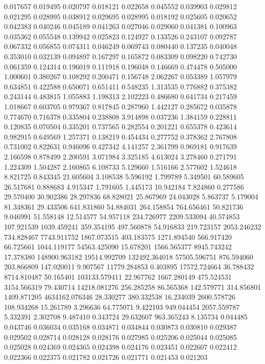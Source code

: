 0.017657
0.019495
0.020797
0.018121
0.022658
0.045552
0.039903
0.029812
0.021295
0.028995
0.038912
0.029695
0.028995
0.018192
0.025605
0.020652
0.042383
0.040246
0.045189
0.041263
0.027046
0.029060
0.041381
0.100963
0.035362
0.055548
0.139942
0.025823
0.124927
0.133526
0.243107
0.092787
0.067332
0.056855
0.074311
0.046249
0.069743
0.080440
0.137235
0.040048
0.353010
0.032139
0.094897
0.167297
0.165872
0.083309
0.098220
0.742730
0.061359
0.124314
0.196019
0.111918
0.196048
0.146669
0.474478
0.505000
1.000601
0.380267
0.108292
0.200471
0.156748
2.062267
0.053389
1.057979
0.634851
0.422588
0.650071
0.651411
0.548235
1.313535
0.776882
0.375382
0.243144
0.483815
1.055883
1.198313
2.102223
0.486680
0.641734
0.217459
1.018667
0.603705
0.979367
0.817845
0.287960
1.442127
0.285672
0.035878
0.774670
0.716378
0.335804
0.238808
3.914898
0.037236
1.384159
0.228811
0.120835
0.070504
0.335201
0.737565
0.282554
0.201221
0.655378
0.423614
0.982915
0.649569
1.257371
0.138219
0.454434
0.277752
0.378362
2.767808
0.731002
0.822631
0.946096
0.427342
4.141257
2.361799
0.969181
0.917639
2.166598
0.878499
2.200591
3.071984
3.325185
4.613024
3.278460
0.271791
1.224309
1.504287
2.160865
6.108733
5.129660
1.516166
2.577602
1.524618
8.821725
0.843345
21.605604
3.108538
5.596192
1.799789
5.349501
60.589605
26.517681
0.888683
4.915347
1.791605
1.445173
10.942184
7.824860
0.277586
29.570400
30.902386
28.297836
68.828021
25.867969
24.043028
5.863737
5.179004
81.348361
29.433506
641.831860
54.884031
264.158854
764.656461
50.821736
9.046991
51.558148
12.514577
54.957118
234.726977
2209.533094
40.574853
107.921539
1039.459241
359.354195
497.560878
54.916833
219.723157
2053.246232
734.828467
7743.911752
1867.073515
403.183575
1271.894540
566.917420
66.725661
1044.119177
54563.425090
15.678201
1566.565377
8945.743242
17.378380
148900.963182
19514.992709
132492.364018
57505.596751
876.594060
203.866809
147.020011
9.907567
11779.284853
0.403895
17572.724664
36.788432
8714.810487
50.165401
103133.579411
22.967762
1667.280149
475.524531
3154.566319
79.430714
14218.081276
256.285258
86.565368
142.579771
314.856801
1409.871205
4634162.076346
28.330277
380.332538
16.234039
2600.578726
108.934268
15.261789
3.296636
64.775071
9.422103
949.044454
2057.559787
5.332391
2.302708
9.487410
0.343724
29.632607
963.365243
8.135734
0.044485
0.043746
0.036034
0.035168
0.034871
0.034844
0.030873
0.030810
0.029387
0.029502
0.028714
0.028128
0.028176
0.027985
0.025206
0.025044
0.025085
0.025028
0.024369
0.024365
0.024398
0.024176
0.023451
0.022607
0.022412
0.022366
0.022375
0.021782
0.021726
0.021771
0.021453
0.021203
